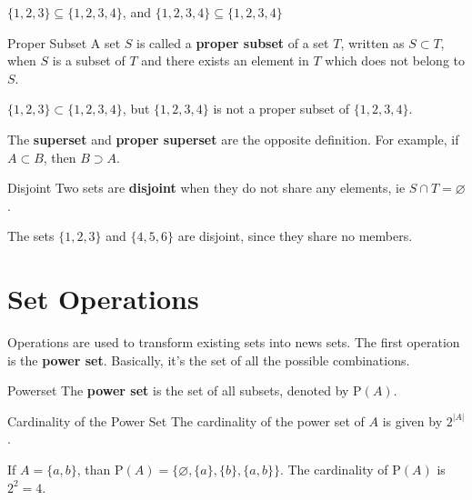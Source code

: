 \begin{boxexample}{}{}
	$\{1,2,3\} \subseteq \{1,2,3,4\}$, and $\{1,2,3,4\} \subseteq \{1,2,3,4\}$
\end{boxexample}

\begin{boxdefine}{Proper Subset}{}
	A set $S$ is called a {\bf proper subset} of a set $T$, written as $S \subset T$, when $S$ is a subset of $T$ and there exists an element in $T$ which does not belong to $S$.
\end{boxdefine}

\begin{boxexample}{}{}
	$\{1,2,3\} \subset \{1,2,3,4\}$, but $\{1,2,3,4\}$ is not a proper subset of $\{1,2,3,4\}$.
\end{boxexample}

The {\bf superset} and {\bf proper superset} are the opposite definition. For example, if $A \subset B$, then $B \supset A$.

\begin{boxdefine}{Disjoint}{}
	Two sets are {\bf disjoint} when they do not share any elements, ie $S \cap T=\varnothing$.
\end{boxdefine}

\begin{boxexample}{}{}
	The sets $\{1,2,3\}$ and $\{4,5,6\}$ are disjoint, since they share no members.
\end{boxexample}

\section{Set Operations}

Operations are used to transform existing sets into news sets.  The first operation is the {\bf power set}. Basically, it's the set of all the possible combinations.

\begin{boxdefine}{Powerset}{}
	The {\bf power set} is the set of all subsets, denoted by $\text{P}(A)$.
\end{boxdefine}

\begin{boxproposition}{Cardinality of the Power Set}{}
	The cardinality of the power set of $A$ is given by $2^{|A|}$.
\end{boxproposition}

\begin{boxexample}{}{}
	If $A=\{a,b\}$, than $\text{P}(A) = \{\varnothing,\{a\},\{b\},\{a,b\}\}$. The cardinality of $\text{P}(A)$ is $2^{2}=4$.
\end{boxexample}

